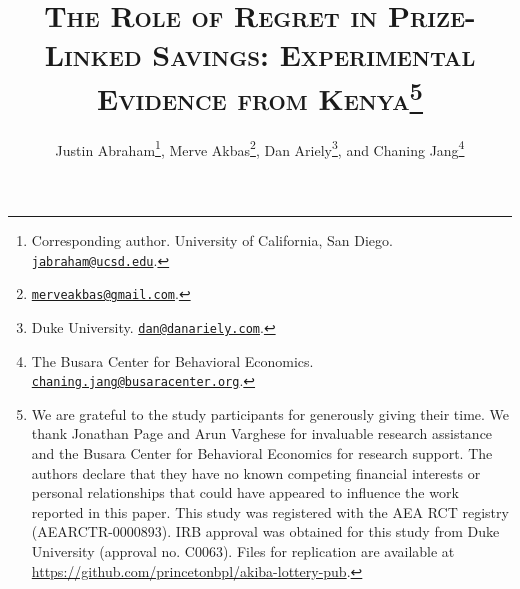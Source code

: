 \documentclass[12pt]{article}
\begin{document}
\title{\textsc{The Role of Regret in Prize-Linked Savings: Experimental Evidence from Kenya}\protect\footnote{We are grateful to the study participants for generously giving their time. We thank Jonathan Page and Arun Varghese for invaluable research assistance and the Busara Center for Behavioral Economics for research support. The authors declare that they have no known competing financial interests or personal relationships that could have appeared to influence the work reported in this paper. This study was registered with the AEA RCT registry (AEARCTR-0000893). IRB approval was obtained for this study from Duke University (approval no. C0063). Files for replication are available at \url{https://github.com/princetonbpl/akiba-lottery-pub}.}}

\author{
    Justin Abraham\thanks{Corresponding author. University of California, San Diego. \protect\href{mailto:jabraham@ucsd.edu}{\nolinkurl{jabraham@ucsd.edu}}.},
    Merve Akbas\thanks{\protect\href{mailto:merveakbas@gmail.com}{\nolinkurl{merveakbas@gmail.com}}.},
    Dan Ariely\thanks{Duke University. \protect\href{mailto:dan@danariely.com}{\nolinkurl{dan@danariely.com}}.}, and
    Chaning Jang\thanks{The Busara Center for Behavioral Economics. \protect\href{mailto:chaning.jang@busaracenter.org}{\nolinkurl{chaning.jang@busaracenter.org}}.}
}

\maketitle
\end{document}

